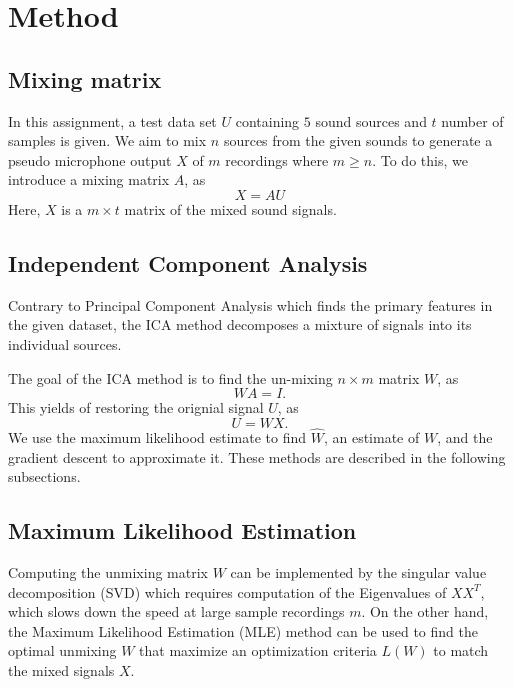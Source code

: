 \documentclass[conference]{IEEEtran}
\begin{document}
\section{Method}
\label{sec:method}

\subsection{Mixing matrix}
In this assignment, a test data set $U$ containing $5$ sound sources and $t$ number of samples is given. We aim to mix $n$ sources from the given sounds to generate a pseudo microphone output $X$ of $m$ recordings where $m\geq n$. To do this, we introduce a mixing matrix $A$, as
\begin{equation}
    X = AU
\end{equation}
Here, $X$ is a $m \times t$ matrix of the mixed sound signals.


\subsection{Independent Component Analysis}

Contrary to Principal Component Analysis which finds the primary features in the given dataset, the ICA method decomposes a mixture of signals into its individual sources. 

The goal of the ICA method is to find the un-mixing $n \times m$ matrix $W$, as
\begin{equation}
    WA = I.
\end{equation}
This yields of restoring the orignial signal $U$, as
\begin{equation}
    U = WX.
\end{equation}
We use the maximum likelihood estimate to find $\hat{W}$, an estimate of $W$, and the gradient descent to approximate it. These methods are described in the following subsections.


\subsection{Maximum Likelihood Estimation}

Computing the unmixing matrix $W$ can be implemented by the singular value decomposition (SVD) which requires computation of the Eigenvalues of $XX^T$, which slows down the speed at large sample recordings $m$.
On the other hand, the Maximum Likelihood Estimation (MLE) method can be used to find the optimal unmixing $W$ that maximize an optimization criteria $L(W)$ to match the mixed signals $X$.
\end{document}
